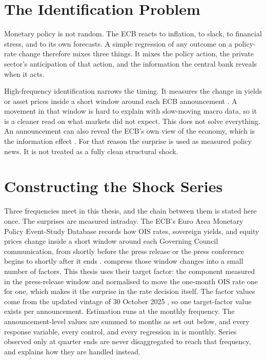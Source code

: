 \section{The Identification Problem}

Monetary policy is not random. The ECB reacts to inflation, to slack, to financial stress, and to its own forecasts. A simple regression of any outcome on a policy-rate change therefore mixes three things. It mixes the policy action, the private sector's anticipation of that action, and the information the central bank reveals when it acts.

High-frequency identification narrows the timing. It measures the change in yields or asset prices inside a short window around each ECB announcement \parencite{Kuttner2001,GertlerKaradi2015,NakamuraSteinsson2018,Altavilla2019}. A movement in that window is hard to explain with slow-moving macro data, so it is a cleaner read on what markets did not expect. This does not solve everything. An announcement can also reveal the ECB's own view of the economy, which is the information effect \parencite{JarocinskiKaradi2020}. For that reason the surprise is used as measured policy news. It is not treated as a fully clean structural shock.

\section{Constructing the Shock Series}
\label{sec:shock-construction}

Three frequencies meet in this thesis, and the chain between them is stated here once. The surprises are measured intraday. The ECB's Euro Area Monetary Policy Event-Study Database records how OIS rates, sovereign yields, and equity prices change inside a short window around each Governing Council communication, from shortly before the press release or the press conference begins to shortly after it ends \parencite{Altavilla2019,ECBEAMPD}. \textcite{Altavilla2019} compress those window changes into a small number of factors. This thesis uses their target factor: the component measured in the press-release window and normalised to move the one-month OIS rate one for one, which makes it the surprise in the rate decision itself. The factor values come from the updated vintage of 30 October 2025 \parencite{RagusaFactors}, so one target-factor value exists per announcement. Estimation runs at the monthly frequency. The announcement-level values are summed to months as set out below, and every response variable, every control, and every regression in  is monthly. Series observed only at quarter ends are never disaggregated to reach that frequency, and  explains how they are handled instead.


